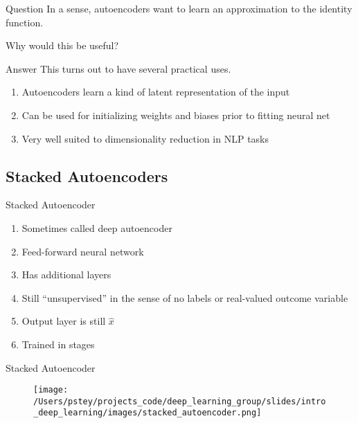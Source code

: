 \documentclass[pdf]{beamer}
\begin{document}
		
		\begin{frame}{Question}
		In a sense, autoencoders want to learn an approximation to the identity function.
			\begin{center}
				Why would this be useful?
			\end{center}
		\end{frame}
		
		\begin{frame}{Answer}
		This turns out to have several practical uses.
		\vspace{2em}
		\begin{enumerate}
			\item Autoencoders learn a kind of latent representation of the input
			\item Can be used for initializing weights and biases prior to fitting neural net
			\item Very well suited to dimensionality reduction in NLP tasks 
		\end{enumerate}
		\end{frame}

	
		

		
\subsection{Stacked Autoencoders}
		\begin{frame}{Stacked Autoencoder}
		\begin{enumerate}
			\item Sometimes called deep autoencoder
			\item Feed-forward neural network
			\item Has additional layers 
			\item Still ``unsupervised'' in the sense of no labels or real-valued outcome variable
			\item Output layer is still $\hat{x}$
			\item Trained in stages
		\end{enumerate}
		\end{frame}
		
		\begin{frame}{Stacked Autoencoder}
		\begin{figure}
			\texttt{[image: /Users/pstey/projects\_code/deep\_learning\_group/slides/intro\_deep\_learning/images/stacked\_autoencoder.png]}
		\end{figure}	
		\end{frame}
		
\end{document}
